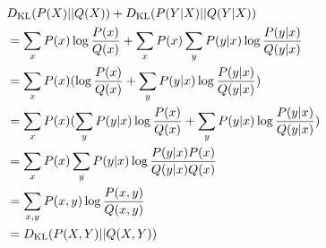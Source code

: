 \begin{answer}
\begin{align*}
    &D_{\text{KL}}(P(X)||Q(X)) + D_{\text{KL}}(P(Y|X)||Q(Y|X))\\
    &= \sum\limits_x P(x) \log \frac{P(x)}{Q(x)} + \sum\limits_x P(x) \sum\limits_y P(y|x) \log \frac{P(y|x)}{Q(y|x)}\\
    &= \sum\limits_x P(x) (\log \frac{P(x)}{Q(x)} + \sum\limits_y P(y|x) \log \frac{P(y|x)}{Q(y|x)})\\
    &= \sum\limits_x P(x) (\sum\limits_y P(y|x) \log \frac{P(x)}{Q(x)} + \sum\limits_y P(y|x) \log \frac{P(y|x)}{Q(y|x)})\\
    &= \sum\limits_x P(x) \sum\limits_y P(y|x) \log \frac{P(y|x) P(x)}{Q(y|x) Q(x)}\\
    &= \sum\limits_{x, y}P(x, y) \log \frac{P(x, y)}{Q(x, y)}\\
    &= D_{\text{KL}}(P(X, Y)||Q(X, Y))
\end{align*}
\end{answer}
